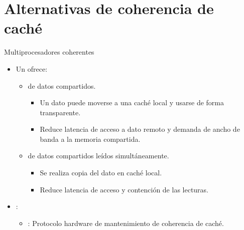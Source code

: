 \section{Alternativas de coherencia de caché}

\begin{frame}[t]{Multiprocesadores coherentes}
\begin{itemize}
  \item Un  ofrece:
    \begin{itemize}
      
      \item {} de datos compartidos.
        \begin{itemize}
          \item Un dato puede moverse a una caché local y usarse de forma transparente.
          \item Reduce latencia de acceso a dato remoto y demanda de ancho de banda a la memoria compartida.
        \end{itemize}
      
      \item {} de datos compartidos leídos simultáneamente.
        \begin{itemize}
          \item Se realiza copia del dato en caché local.
          \item Reduce latencia de acceso y contención de las lecturas.
        \end{itemize}
    \end{itemize}

  \item {}:
    \begin{itemize}
      \item {}: Protocolo hardware de mantenimiento de coherencia de caché.
    \end{itemize}
\end{itemize}
\end{frame}

